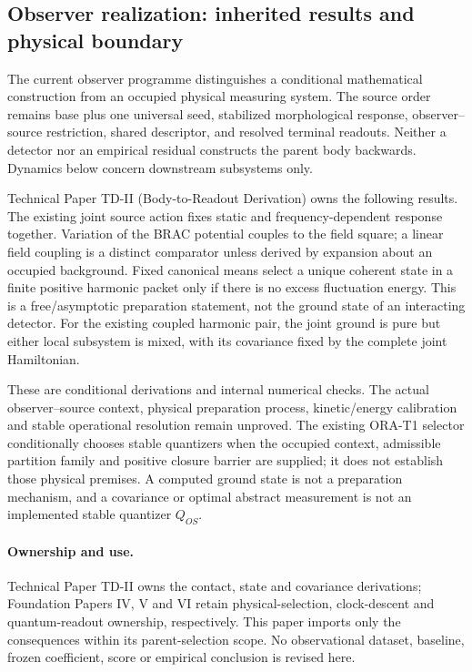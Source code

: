 \documentclass[11pt]{article}
\begin{document}
\subsection{Observer realization: inherited results and physical boundary}
\label{sec:observer-update-20260914}
The current observer programme distinguishes a conditional mathematical
construction from an occupied physical measuring system. The source order
remains base plus one universal seed, stabilized morphological response,
observer--source restriction, shared descriptor, and resolved terminal
readouts. Neither a detector nor an empirical residual constructs the parent
body backwards. Dynamics below concern downstream subsystems only.

Technical Paper TD-II (Body-to-Readout Derivation) owns the following
results. The existing joint source action fixes static and frequency-dependent
response together. Variation of the BRAC potential couples to the field
square; a linear field coupling is a distinct comparator unless derived by
expansion about an occupied background. Fixed canonical means select a unique
coherent state in a finite positive harmonic packet only if there is no excess
fluctuation energy. This is a free/asymptotic preparation statement, not the
ground state of an interacting detector. For the existing coupled harmonic
pair, the joint ground is pure but either local subsystem is mixed, with its
covariance fixed by the complete joint Hamiltonian.

These are conditional derivations and internal numerical checks. The actual
observer--source context, physical preparation process, kinetic/energy
calibration and stable operational resolution remain unproved. The existing
ORA-T1 selector conditionally chooses stable quantizers when the occupied
context, admissible partition family and positive closure barrier are supplied;
it does not establish those physical premises. A computed ground state is not
a preparation mechanism, and a covariance or optimal abstract measurement is
not an implemented stable quantizer $Q_{OS}$.

\paragraph{Ownership and use.}
Technical Paper TD-II owns the contact, state and covariance derivations;
Foundation Papers IV, V and VI retain physical-selection, clock-descent and
quantum-readout ownership, respectively. This paper imports only the
consequences within its parent-selection scope. No observational dataset,
baseline, frozen coefficient, score or empirical conclusion is revised here.
\end{document}
